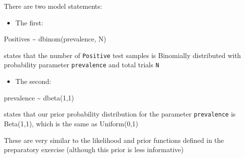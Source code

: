 \documentclass[
  ignorenonframetext,
  aspectratio=169,
]{beamer}
\newenvironment{Shaded}{\begin{snugshade}}{\end{snugshade}}
\newcommand{\DecValTok}[1]{\textcolor[rgb]{0.00,0.00,0.81}{#1}}
\newcommand{\FunctionTok}[1]{\textcolor[rgb]{0.00,0.00,0.00}{#1}}
\newcommand{\NormalTok}[1]{#1}
\newcommand{\SpecialCharTok}[1]{\textcolor[rgb]{0.00,0.00,0.00}{#1}}
\providecommand{\tightlist}{%
  \setlength{\itemsep}{0pt}\setlength{\parskip}{0pt}}
\begin{document}
\begin{frame}[fragile]
There are two model statements:

\begin{itemize}
\tightlist
\item
  The first: \scriptsize
\end{itemize}

\begin{Shaded}
\begin{Highlighting}[]
\NormalTok{Positives }\SpecialCharTok{\textasciitilde{}} \FunctionTok{dbinom}\NormalTok{(prevalence, N)}
\end{Highlighting}
\end{Shaded}

\normalsize

states that the number of \texttt{Positive} test samples is Binomially
distributed with probability parameter \texttt{prevalence} and total
trials \texttt{N}

\pause

\begin{itemize}
\tightlist
\item
  The second: \scriptsize
\end{itemize}

\begin{Shaded}
\begin{Highlighting}[]
\NormalTok{prevalence }\SpecialCharTok{\textasciitilde{}} \FunctionTok{dbeta}\NormalTok{(}\DecValTok{1}\NormalTok{,}\DecValTok{1}\NormalTok{)}
\end{Highlighting}
\end{Shaded}

\normalsize

states that our prior probability distribution for the parameter
\texttt{prevalence} is Beta(1,1), which is the same as Uniform(0,1)

\pause

These are very similar to the likelihood and prior functions defined in
the preparatory exercise (although this prior is less informative)
\end{frame}
\end{document}
